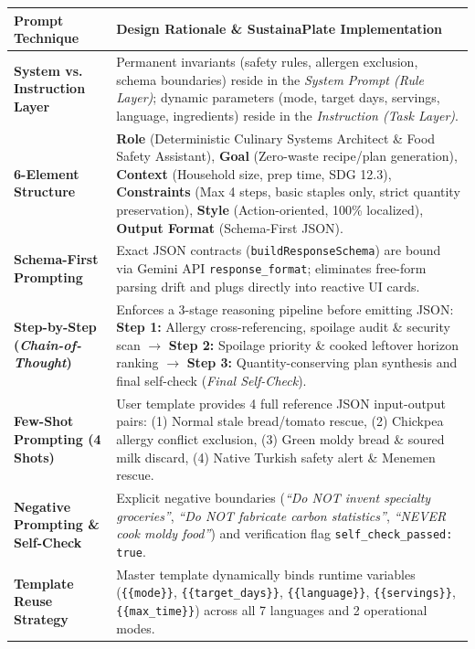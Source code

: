 \documentclass[9pt,a4paper]{article}
\begin{document}
\vspace{1pt}
{\scriptsize
\renewcommand{\arraystretch}{1.12}
\begin{tabularx}{\textwidth}{>{\bfseries\color{undpdark}}p{3.1cm} X}
\toprule
\textbf{Prompt Technique} & \textbf{Design Rationale \& SustainaPlate Implementation} \\
\midrule
System vs. Instruction Layer & Permanent invariants (safety rules, allergen exclusion, schema boundaries) reside in the \emph{System Prompt (Rule Layer)}; dynamic parameters (mode, target days, servings, language, ingredients) reside in the \emph{Instruction (Task Layer)}. \\
6-Element Structure & \textbf{Role} (Deterministic Culinary Systems Architect \& Food Safety Assistant), \textbf{Goal} (Zero-waste recipe/plan generation), \textbf{Context} (Household size, prep time, SDG 12.3), \textbf{Constraints} (Max 4 steps, basic staples only, strict quantity preservation), \textbf{Style} (Action-oriented, 100\% localized), \textbf{Output Format} (Schema-First JSON). \\
Schema-First Prompting & Exact JSON contracts (\texttt{buildResponseSchema}) are bound via Gemini API \texttt{response\_format}; eliminates free-form parsing drift and plugs directly into reactive UI cards. \\
Step-by-Step (\emph{Chain-of-Thought}) & Enforces a 3-stage reasoning pipeline before emitting JSON: \textbf{Step 1:} Allergy cross-referencing, spoilage audit \& security scan $\rightarrow$ \textbf{Step 2:} Spoilage priority \& cooked leftover horizon ranking $\rightarrow$ \textbf{Step 3:} Quantity-conserving plan synthesis and final self-check (\emph{Final Self-Check}). \\
Few-Shot Prompting (4 Shots) & User template provides 4 full reference JSON input-output pairs: (1) Normal stale bread/tomato rescue, (2) Chickpea allergy conflict exclusion, (3) Green moldy bread \& soured milk discard, (4) Native Turkish safety alert \& Menemen rescue. \\
Negative Prompting \& Self-Check & Explicit negative boundaries (\emph{``Do NOT invent specialty groceries''}, \emph{``Do NOT fabricate carbon statistics''}, \emph{``NEVER cook moldy food''}) and verification flag \texttt{self\_check\_passed: true}. \\
Template Reuse Strategy & Master template dynamically binds runtime variables (\texttt{\{\{mode\}\}}, \texttt{\{\{target\_days\}\}}, \texttt{\{\{language\}\}}, \texttt{\{\{servings\}\}}, \texttt{\{\{max\_time\}\}}) across all 7 languages and 2 operational modes. \\
\bottomrule
\end{tabularx}
}
\end{document}
